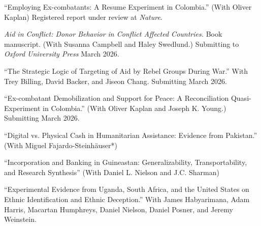 \documentclass[10pt]{article}
\begin{document}
\begin{etaremune}\setlength{\itemsep}{3pt}

\item ``Employing Ex-combatants: A Resume Experiment in Colombia.'' (With Oliver Kaplan) Registered report under review at \textit{Nature}.

\item \textit{Aid in Conflict: Donor Behavior in Conflict Affected Countries.} Book manuscript. (With Susanna Campbell and Haley Swedlund.) Submitting to \textit{Oxford University Press} March 2026. 

\item ``The Strategic Logic of Targeting of Aid by Rebel Groups During War.'' With Trey Billing,  David Backer, and Jiseon Chang. Submitting March 2026.

\item ``Ex-combatant Demobilization and Support for Peace: A Reconciliation Quasi-Experiment in Colombia.'' (With Oliver Kaplan and Joseph K. Young.) Submitting March 2026.

\item ``Digital vs. Physical Cash in Humanitarian Assistance: Evidence from Pakistan.'' (With Miguel Fajardo-Steinh{\"a}user*)

\item ``Incorporation and Banking in Guineastan: Generalizability, Transportability, and Research Synthesis'' (With Daniel L. Nielson and J.C. Sharman)
 
\item ``Experimental Evidence from Uganda, South Africa, and the United States on Ethnic Identification and Ethnic Deception.'' With James Habyarimana, Adam Harris, Macartan Humphreys, Daniel Nielson, Daniel Posner, and Jeremy Weinstein. 




\end{etaremune}
\end{document}
